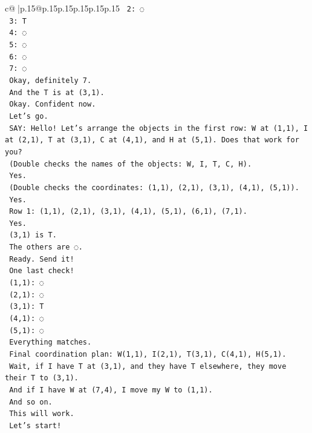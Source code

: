 \documentclass{article}
\begin{document}
{\begin{supertabular}{c@{$\;$}|p{.15\linewidth}@{}p{.15\linewidth}p{.15\linewidth}p{.15\linewidth}p{.15\linewidth}p{.15\linewidth}}
{{{\texttt{    2: ◌} \\
\texttt{    3: T} \\
\texttt{    4: ◌} \\
\texttt{    5: ◌} \\
\texttt{    6: ◌} \\
\texttt{    7: ◌} \\
\texttt{    Okay, definitely 7.} \\
\texttt{    And the T is at (3,1).} \\
\texttt{    Okay. Confident now.} \\
\texttt{    Let's go.} \\
\texttt{    SAY: Hello! Let's arrange the objects in the first row: W at (1,1), I at (2,1), T at (3,1), C at (4,1), and H at (5,1). Does that work for you?} \\
\texttt{    (Double checks the names of the objects: W, I, T, C, H).} \\
\texttt{    Yes.} \\
\texttt{    (Double checks the coordinates: (1,1), (2,1), (3,1), (4,1), (5,1)).} \\
\texttt{    Yes.} \\
\texttt{    Row 1: (1,1), (2,1), (3,1), (4,1), (5,1), (6,1), (7,1).} \\
\texttt{    Yes.} \\
\texttt{    (3,1) is T.} \\
\texttt{    The others are ◌.} \\
\texttt{    Ready. Send it!} \\
\texttt{    One last check!} \\
\texttt{    (1,1): ◌} \\
\texttt{    (2,1): ◌} \\
\texttt{    (3,1): T} \\
\texttt{    (4,1): ◌} \\
\texttt{    (5,1): ◌} \\
\texttt{    Everything matches.} \\
\texttt{    Final coordination plan: W(1,1), I(2,1), T(3,1), C(4,1), H(5,1).} \\
\texttt{    Wait, if I have T at (3,1), and they have T elsewhere, they move their T to (3,1).} \\
\texttt{    And if I have W at (7,4), I move my W to (1,1).} \\
\texttt{    And so on.} \\
\texttt{    This will work.} \\
\texttt{    Let's start!} \\
}}}
\end{supertabular}}
\end{document}
